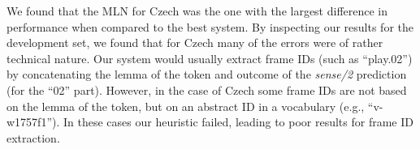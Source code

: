 
We found that the MLN for Czech was the one 
with the largest difference in performance when compared to the best 
system. By inspecting our results for the development set, we found that for Czech many of the 
errors were of rather technical nature. Our system would usually extract frame IDs (such as ``play.02'') by concatenating the lemma of the token and outcome of the \emph{sense/2} prediction (for the ``02'' part). However, in the case of Czech some frame IDs are not based on the lemma of the token, but on an abstract ID in a vocabulary (e.g., ``v-w1757f1''). In these cases our heuristic failed, leading to poor results for frame ID extraction. 





